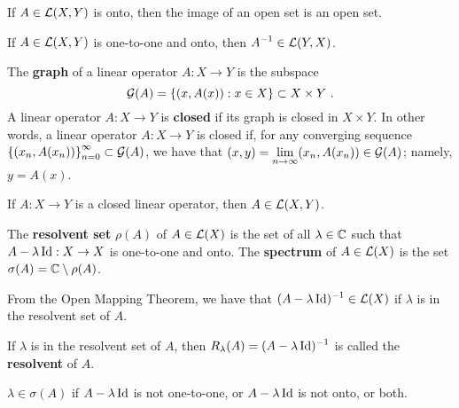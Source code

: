 \begin{theorem}
If $A\in \mathcal{L}(X,Y)$ is onto, then the image of an open set is an
open set.    
\end{theorem}

\begin{theorem}
If $A\in \mathcal{L}(X,Y)$ is one-to-one and onto, then
$\displaystyle A^{-1} \in \mathcal{L}(Y,X)$.
\end{theorem}

\begin{defn}
The {\bfseries graph} of a linear operator
$A:X\rightarrow Y$ is the subspace
\[
\mathcal{G}(A) = \left\{ (x,A(x)) : x \in X \right\} \subset X \times Y  \ .
\]
A linear operator $A:X\rightarrow Y$ is
{\bfseries closed} if its
graph is closed in $X\times Y$.  In other words, a linear operator
$A:X \rightarrow Y$ is closed if, for any converging sequence
$\displaystyle \left\{ (x_n, A(x_n)) \right\}_{n=0}^\infty \subset \mathcal{G}(A)$,
we have that
$\displaystyle (x,y) = \lim_{n\to\infty} (x_n, A(x_n)) \in \mathcal{G}(A)$; namely,
$y=A(x)$.
\end{defn}

\begin{theorem}
If $A:X\rightarrow Y$ is a closed linear operator, then $A \in \mathcal{L}(X,Y)$.
\end{theorem}

\begin{defn}
The {\bfseries resolvent set}
$\rho(A)$ of $A \in \mathcal{L}(X)$ is the set
of all $\lambda \in \mathbb{C}$ such that $A-\lambda \operatorname{Id}: X \rightarrow X$ is
one-to-one and onto.
The {\bfseries spectrum}
of $A \in \mathcal{L}(X)$ is the set $\sigma(A) = \mathbb{C} \setminus \rho(A)$.
\end{defn}

From the Open Mapping Theorem, we have that
$\displaystyle (A-\lambda \operatorname{Id})^{-1} \in \mathcal{L}(X)$ if $\lambda$ is in the
resolvent set of $A$.

\begin{defn}
If $\lambda$ is in the resolvent set of $A$, then
$\displaystyle R_\lambda(A) = (A-\lambda\operatorname{Id})^{-1}$ is called the
{\bfseries resolvent}
of $A$.
\end{defn}

$\lambda \in \sigma(A)$ if $A-\lambda \operatorname{Id}$ is not one-to-one, or
$A-\lambda \operatorname{Id}$ is not onto, or both.

